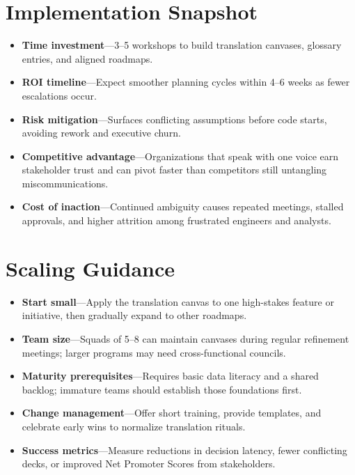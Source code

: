 \section{Implementation Snapshot}
\label{sec:translation-snapshot}
\begin{itemize}
    \item \textbf{Time investment}—3--5 workshops to build translation canvases, glossary entries, and aligned roadmaps.
    \item \textbf{ROI timeline}—Expect smoother planning cycles within 4--6 weeks as fewer escalations occur.
    \item \textbf{Risk mitigation}—Surfaces conflicting assumptions before code starts, avoiding rework and executive churn.
    \item \textbf{Competitive advantage}—Organizations that speak with one voice earn stakeholder trust and can pivot faster than competitors still untangling miscommunications.
    \item \textbf{Cost of inaction}—Continued ambiguity causes repeated meetings, stalled approvals, and higher attrition among frustrated engineers and analysts.
\end{itemize}
\section{Scaling Guidance}
\label{sec:translation-scaling}
\begin{itemize}
    \item \textbf{Start small}—Apply the translation canvas to one high-stakes feature or initiative, then gradually expand to other roadmaps.
    \item \textbf{Team size}—Squads of 5--8 can maintain canvases during regular refinement meetings; larger programs may need cross-functional councils.
    \item \textbf{Maturity prerequisites}—Requires basic data literacy and a shared backlog; immature teams should establish those foundations first.
    \item \textbf{Change management}—Offer short training, provide templates, and celebrate early wins to normalize translation rituals.
    \item \textbf{Success metrics}—Measure reductions in decision latency, fewer conflicting decks, or improved Net Promoter Scores from stakeholders.
\end{itemize}

